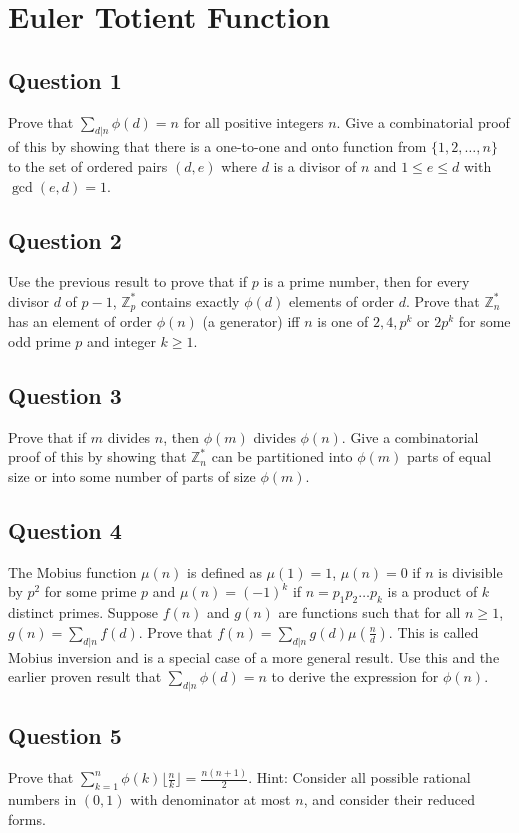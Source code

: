 \documentclass[12pt]{report}
\begin{document}
\chapter{Euler Totient Function}
\section*{Question 1}
Prove that $\sum\limits_{d | n} \phi(d) = n$ for all positive integers $n$. Give a combinatorial proof of this by showing that there is a one-to-one and onto function from $\{1, 2, \dots, n\}$ to the set of ordered pairs $(d, e)$ where $d$ is a divisor of $n$ and $1 \leq e \leq d$ with $\gcd(e, d) = 1$.
\section*{Question 2}
Use the previous result to prove that if $p$ is a prime number, then for every divisor $d$ of $p - 1$, $\mathbb{Z}_{p}^{*}$ contains exactly $\phi(d)$ elements of order $d$. Prove that $\mathbb{Z}_{n}^{*}$ has an element of order $\phi(n)$ (a generator) iff $n$ is one of $2, 4, p^{k}$ or $2p^{k}$ for some odd prime $p$ and integer $k \geq 1$.
\section*{Question 3}
Prove that if $m$ divides $n$, then $\phi(m)$ divides $\phi(n)$. Give a combinatorial proof of this by showing that $\mathbb{Z}_{n}^{*}$ can be partitioned into $\phi(m)$ parts of equal size or into some number of parts of size $\phi(m)$.
\section*{Question 4}
The Mobius function $\mu(n)$ is defined as $\mu(1) = 1$, $\mu(n) = 0$ if $n$ is divisible by $p^2$ for some prime $p$ and $\mu(n) = (-1)^{k}$ if $n = p_{1}p_{2}\dots p_{k}$ is a product of $k$ distinct primes. Suppose $f(n)$ and $g(n)$ are functions such that for all $n \geq 1$, $g(n) = \sum\limits_{d | n} f(d)$. Prove that $f(n) = \sum\limits_{d | n}g(d)\mu(\frac{n}{d})$. This is called Mobius inversion and is a special case of a more general result. Use this and the earlier proven result that $\sum\limits_{d | n} \phi(d) = n$ to derive the expression for $\phi(n)$.
\section*{Question 5}
Prove that $\sum\limits_{k = 1}^{n}\phi(k)\lfloor \frac{n}{k}\rfloor = \frac{n(n + 1)}{2}$. Hint: Consider all possible rational numbers in $(0, 1)$ with denominator at most $n$, and consider their reduced forms.
\end{document}
